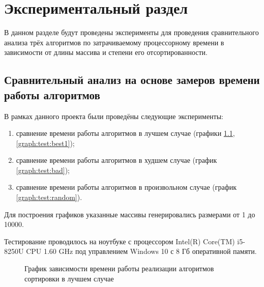 \documentclass[utf8x, 12pt]{G7-32}
\begin{document}
\chapter{Экспериментальный раздел}
\label{cha:research}
    В данном разделе будут проведены эксперименты для проведения 
    сравнительного анализа трёх алгоритмов по затрачиваемому процессорному 
    времени в зависимости от длины массива и степени его отсортированности.

    \section{Сравнительный анализ на основе замеров времени работы алгоритмов}
        В рамках данного проекта были проведёны следующие эксперименты:
        \begin{enumerate}
            \item сравнение времени работы алгоритмов в лучшем случае (графики \ref{graph:test:best}, \ref{graph:test:best1});
            \item сравнение времени работы алгоритмов в худшем случае (график \ref{graph:test:bad});
            \item сравнение времени работы алгоритмов в произвольном случае (график \ref{graph:test:random}).
        \end{enumerate}

	Для построения графиков 
        указанные массивы генерировались размерами от 1 до 10000.

        Тестирование проводилось на ноутбуке с процессором
        Intel(R) Core(TM) i5-8250U CPU 1.60 GHz
        под управлением Windows 10 с 8 Гб оперативной памяти.


    \begin{figure}[h!]
        \centering
        \caption{График зависимости времени работы реализации алгоритмов сортировки в лучшем случае} 
        \label{graph:test:best}
    \end{figure}
\end{document}
